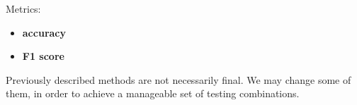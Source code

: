 \documentclass[fleqn,moreauthors,10pt]{ds_report}
\begin{document}
    Metrics: 
    \begin{itemize}
        \item \textbf{accuracy}
        \item \textbf{F1 score}
     \end{itemize}

    Previously described methods are not necessarily final. We may change some of them, in order to achieve a manageable set of testing combinations.
    









\end{document}

